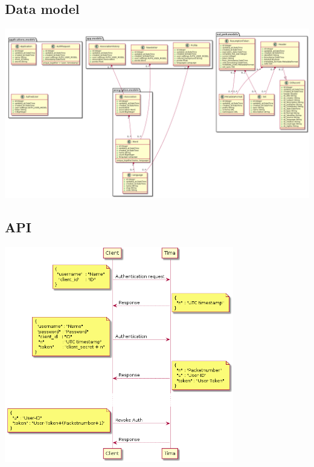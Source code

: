 \documentclass[11pt]{beamer}
\begin{document}
\subsection{Data model}
\begin{frame}
	\begin{center}
		\includegraphics[width=\textwidth]{../UML/tima.png}
	\end{center}
\end{frame}

\subsection{API}
\begin{frame}
	\begin{center}
		\includegraphics[width=0.75\textwidth]{../UML/auth.png}
	\end{center}
\end{frame}
\end{document}
